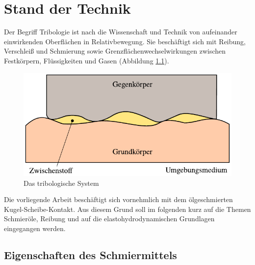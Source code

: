 \chapter{Stand der Technik}
\label{chap:stand_der_technik}

Der Begriff Tribologie ist nach \cite{bartz_2000} die Wissenschaft und Technik von aufeinander einwirkenden Oberflächen in Relativbewegung.
Sie beschäftigt sich mit Reibung, Verschleiß und Schmierung sowie Grenzflächenwechselwirkungen zwischen Festkörpern, Flüssigkeiten und Gasen (Abbildung \ref{fig:das_tribologische_system}).

\begin{figure}[htb]
    \centering
    \includegraphics[]{./images/tribologisches_system.pdf}
    \caption{Das tribologische System\cite{wisniewski}}
    \label{fig:das_tribologische_system}
\end{figure}

Die vorliegende Arbeit beschäftigt sich vornehmlich mit dem ölgeschmierten Kugel-Scheibe-Kontakt.
Aus diesem Grund soll im folgenden kurz auf die Themen Schmieröle, Reibung und auf die elastohydrodynamischen Grundlagen eingegangen werden.

\section{Eigenschaften des Schmiermittels}
\label{sec:eigenschaften_des_schmiermittels}

